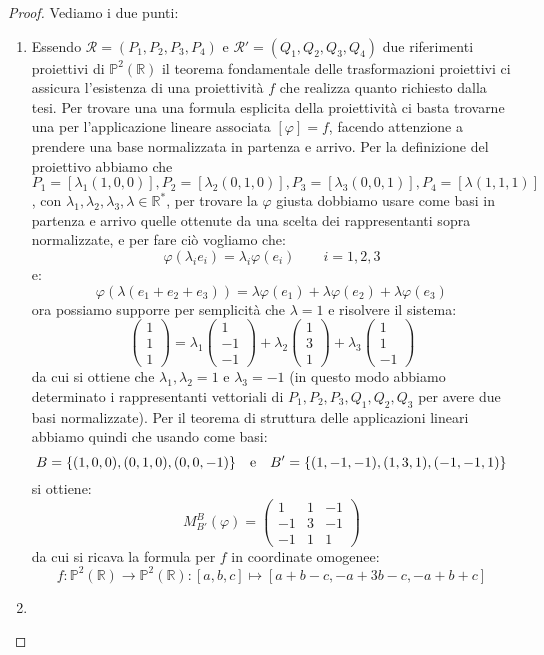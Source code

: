 \documentclass[12pt]{article}
\theoremstyle{remark}
\theoremstyle{definition}
\newenvironment{solution}{\renewcommand{\proofname}{Soluzione}\begin{proof}}{\end{proof}}
\newcommand{\RR}{\mathbb{R}}
\newcommand{\PP}{\mathbb{P}}
\begin{document}
\begin{solution}
  Vediamo i due punti:
  \begin{enumerate}[(1)]
    \item Essendo $\mathscr{R} = (P_1,P_2,P_3,P_4)$ e $\mathscr{R}' = (Q_1,Q_2,Q_3,Q_4)$ due riferimenti proiettivi di $\PP^2(\RR)$ il teorema fondamentale delle trasformazioni proiettivi ci assicura l'esistenza di una proiettività $f$ che realizza quanto richiesto dalla tesi. Per trovare una 
    una formula esplicita della proiettività ci basta trovarne una per l'applicazione lineare associata $[\varphi] = f$, facendo attenzione a prendere una base normalizzata in partenza e arrivo. Per la definizione del proiettivo abbiamo che $P_1 = [\lambda_1(1,0,0)], P_2 = [\lambda_2(0,1,0)], P_3 = [\lambda_3(0,0,1)], P_4 = [\lambda(1,1,1)]$, con $\lambda_1,\lambda_2,\lambda_3,\lambda \in \RR^*$,
    per trovare la $\varphi$ giusta dobbiamo usare come basi in partenza e arrivo quelle ottenute da una scelta dei rappresentanti sopra normalizzate, e per fare ciò vogliamo che:
    \[ \varphi(\lambda_ie_i) = \lambda_i \varphi(e_i) \qquad i = 1,2,3
      \]
    e:
    \[ \varphi(\lambda(e_1+e_2+e_3)) = \lambda \varphi(e_1) + \lambda \varphi(e_2) + \lambda \varphi(e_3) 
      \]
    ora possiamo supporre per semplicità che $\lambda = 1$ e risolvere il sistema:
    \[ \begin{pmatrix} 1 \\ 1 \\ 1 \end{pmatrix} = \lambda_1 \begin{pmatrix} 1 \\ -1 \\ - 1\end{pmatrix} + \lambda_2 \begin{pmatrix} 1 \\ 3 \\ 1 \end{pmatrix} + \lambda_3 \begin{pmatrix} 1 \\ 1 \\ - 1\end{pmatrix}
      \]
    da cui si ottiene che $\lambda_1,\lambda_2 = 1$ e $\lambda_3 = -1$ (in questo modo abbiamo determinato i rappresentanti vettoriali di $P_1,P_2,P_3,Q_1,Q_2,Q_3$ per avere due basi normalizzate). Per il teorema di struttura delle applicazioni lineari abbiamo quindi che usando come basi:
    \[ B = \{(1,0,0),(0,1,0),(0,0,-1)\} \quad \text e \quad B' = \{(1,-1,-1),(1,3,1),(-1,-1,1)\}
      \]
    si ottiene:
    \[ M_{B'}^{B}(\varphi) = \begin{pmatrix} 1 & 1 & -1 \\ -1 & 3 & -1 \\ -1 & 1 & 1\end{pmatrix}
      \]
    da cui si ricava la formula per $f$ in coordinate omogenee:
    \[ f : \PP^2(\RR) \longrightarrow \PP^2(\RR) : [a,b,c] \longmapsto [a+b-c,-a+3b-c,-a+b+c]
      \]
    \item
  \end{enumerate}
\end{solution}
\end{document}
